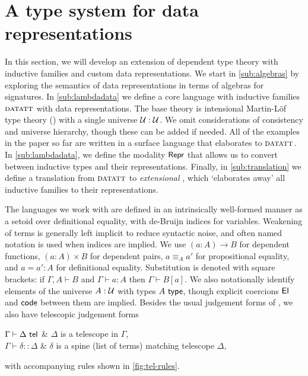 \section{A type system for data representations}\label{sec:type-system}

In this section, we will develop an extension of dependent type theory with
inductive families and custom data representations. We start in
\cref{sub:algebras} by exploring the semantics of data representations in terms
of algebras for signatures. In \cref{sub:lambdadata} we define a core language
with inductive families ${\textsc{datatt}}$ with data representations. The base theory
is intensional Martin-L\"of type theory (\lambdamltt) \cite{Martin-Lof1984-pz}
with a single universe $\mathcal{U} : \mathcal{U}$. We omit considerations of consistency
and universe hierarchy, though these can be added if needed. All of the examples
in the paper so far are written in a surface language that elaborates to
${\textsc{datatt}}$. In \cref{sub:lambdadata}, we define the modality $\textsf{Repr}$ that
allows us to convert between inductive types and their representations. Finally,
in \cref{sub:translation} we define a translation from ${\textsc{datatt}}$ to
\emph{extensional} \lambdamltt, which `elaborates away' all inductive families
to their representations.

The languages we work with are defined in an intrinsically well-formed manner
as a setoid over definitional equality, with de-Bruijn
indices for variables. Weakening of terms is generally left implicit to reduce
syntactic noise, and often named notation is used when indices are
implied. We use $(a : A) \to B$ for dependent functions, $(a : A) \times B$ for
dependent pairs, $a \equiv_A a'$ for propositional equality, and $a = a' : A$
for definitional equality. Substitution is denoted with square brackets: if
$\Gamma, A \vdash B$ and $\Gamma \vdash a : A$ then $\Gamma \vdash B[a]$. We
also notationally identify elements of the universe $A : \mathcal{U}$ with types $A
\ \textsf{type}$, though explicit coercions $\textsf{El}$ and $\textsf{code}$ between them are
implied.
Besides the
usual judgement forms of \lambdamltt, we also have telescopic judgement forms
\begin{definitions}
$\Gamma \vdash \Delta \ \textsf{tel}$                & $\Delta$ is a telescope in $\Gamma$, \\
$\Gamma \vdash \delta :: \Delta$           & $\delta$ is a spine (list of terms) matching telescope $\Delta$,
\end{definitions}
with accompanying rules shown in \cref{fig:tel-rules}.

